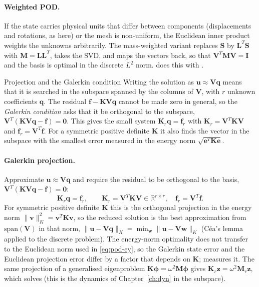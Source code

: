 \paragraph{Weighted POD.}
If the state carries physical units that differ between components (displacements and rotations, as here) or the mesh is non-uniform, the Euclidean inner product weights the unknowns arbitrarily. The mass-weighted variant replaces $\bm S$ by $\bm L^T\bm S$ with $\bm M=\bm L\bm L^T$, takes the SVD, and maps the vectors back, so that $\bm V^T\bm M\bm V=\bm I$ and the basis is optimal in the discrete $L^2$ norm.  does this with .

\begin{sidenote}{Projection and the Galerkin condition}
Writing the solution as $\bm u\approx\bm V\bm q$ means that it is searched in the subspace spanned by the columns of $\bm V$, with $r$ unknown coefficients $\bm q$. The residual $\bm f-\bm K\bm V\bm q$ cannot be made zero in general, so the \emph{Galerkin condition} asks that it be orthogonal to the subspace, $\bm V^T(\bm K\bm V\bm q-\bm f)=\bm0$. This gives the small system $\bm K_r\bm q=\bm f_r$ with $\bm K_r=\bm V^T\bm K\bm V$ and $\bm f_r=\bm V^T\bm f$. For a symmetric positive definite $\bm K$ it also finds the vector in the subspace with the smallest error measured in the energy norm $\sqrt{\bm e^T\bm K\bm e}$.
\end{sidenote}

\paragraph{Galerkin projection.}
Approximate $\bm u\approx\bm V\bm q$ and require the residual to be orthogonal to the basis, $\bm V^T(\bm K\bm V\bm q-\bm f)=\bm 0$:
\begin{equation}\label{eq:pod-galerkin}
\bm K_r\bm q=\bm f_r,\qquad \bm K_r=\bm V^T\bm K\bm V\in\mathbb R^{r\times r},\quad \bm f_r=\bm V^T\bm f .
\end{equation}
For symmetric positive definite $\bm K$ this is the orthogonal projection in the energy norm $\|\bm v\|_K^2=\bm v^T\bm K\bm v$, so the reduced solution is the best approximation from $\mathrm{span}(\bm V)$ in that norm, $\|\bm u-\bm V\bm q\|_K=\min_{\bm w}\|\bm u-\bm V\bm w\|_K$ (Céa's lemma applied to the discrete problem). The energy-norm optimality does not transfer to the Euclidean norm used in \cref{eq:pod-ey}, so the Galerkin state error and the Euclidean projection error differ by a factor that depends on $\bm K$;  measures it. The same projection of a generalised eigenproblem $\bm K\bm\phi=\omega^2\bm M\bm\phi$ gives $\bm K_r\bm z=\omega^2\bm M_r\bm z$, which  solves (this is the dynamics of Chapter~\ref{ch:dyn} in the subspace).

